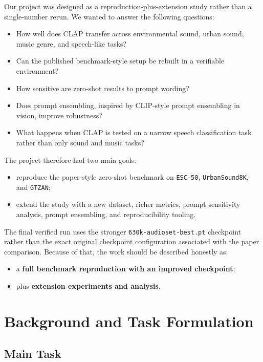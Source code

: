 \documentclass[11pt]{article}
\newcommand{\dataset}[1]{\texttt{#1}}
\begin{document}
Our project was designed as a reproduction-plus-extension study rather than a
single-number rerun. We wanted to answer the following questions:

\begin{itemize}[leftmargin=1.25em]
  \item How well does CLAP transfer across environmental sound, urban sound,
  music genre, and speech-like tasks?
  \item Can the published benchmark-style setup be rebuilt in a verifiable
  environment?
  \item How sensitive are zero-shot results to prompt wording?
  \item Does prompt ensembling, inspired by CLIP-style prompt ensembling in
  vision, improve robustness?
  \item What happens when CLAP is tested on a narrow speech classification task
  rather than only sound and music tasks?
\end{itemize}

The project therefore had two main goals:
\begin{itemize}[leftmargin=1.25em]
  \item reproduce the paper-style zero-shot benchmark on
  \dataset{ESC-50}, \dataset{UrbanSound8K}, and \dataset{GTZAN};
  \item extend the study with a new dataset, richer metrics, prompt
  sensitivity analysis, prompt ensembling, and reproducibility tooling.
\end{itemize}

The final verified run uses the stronger
\dataset{630k-audioset-best.pt} checkpoint rather than the exact original
checkpoint configuration associated with the paper comparison. Because of that,
the work should be described honestly as:

\begin{itemize}[leftmargin=1.25em]
  \item a \textbf{full benchmark reproduction with an improved checkpoint};
  \item plus \textbf{extension experiments and analysis}.
\end{itemize}

\section{Background and Task Formulation}

\subsection{Main Task}
\end{document}
